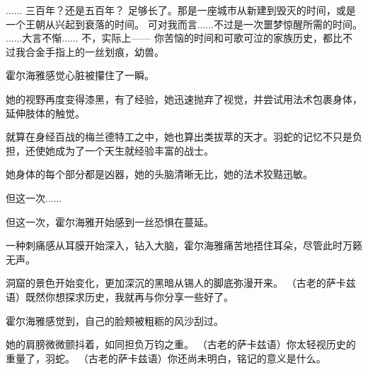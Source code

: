 \documentclass[openany]{book}
\begin{document}
\begin{dialogue}
     ......
     三百年？还是五百年？
     足够长了。那是一座城市从新建到毁灭的时间，或是一个王朝从兴起到衰落的时间。
     可对我而言......不过是一次噩梦惊醒所需的时间。
     ......大言不惭......
     不，实际上——
     你苦恼的时间和可歌可泣的家族历史，都比不过我合金手指上的一丝划痕，幼兽。\par
    霍尔海雅感觉心脏被攥住了一瞬。\par
    她的视野再度变得漆黑，有了经验，她迅速抛弃了视觉，并尝试用法术包裹身体，延伸肢体的触觉。\par
    就算在身经百战的梅兰德特工之中，她也算出类拔萃的天才。羽蛇的记忆不只是负担，还使她成为了一个天生就经验丰富的战士。\par
    她身体的每个部分都是凶器，她的头脑清晰无比，她的法术狡黠迅敏。\par
    但这一次......\par
    但这一次，霍尔海雅开始感到一丝恐惧在蔓延。\par
    一种刺痛感从耳膜开始深入，钻入大脑，霍尔海雅痛苦地捂住耳朵，尽管此时万籁无声。\par
    洞窟的景色开始变化，更加深沉的黑暗从锡人的脚底弥漫开来。
     （古老的萨卡兹语）既然你想探求历史，我就再与你分享一些好了。\par
    霍尔海雅感觉到，自己的脸颊被粗粝的风沙刮过。\par
    她的肩膀微微颤抖着，如同担负万钧之重。
     （古老的萨卡兹语）你太轻视历史的重量了，羽蛇。
     （古老的萨卡兹语）你还尚未明白，铭记的意义是什么。
\end{dialogue}
\end{document}
